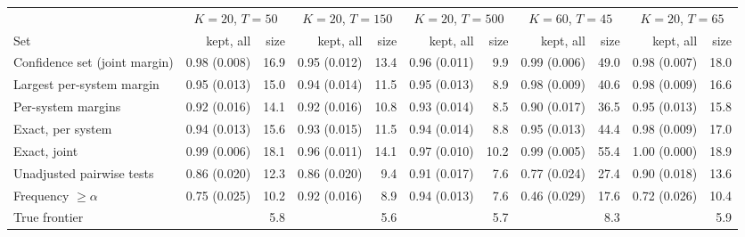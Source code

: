 \begin{tabular}{lrrrrrrrrrr}
\toprule
 & \multicolumn{2}{c}{$K=20$, $T=50$} & \multicolumn{2}{c}{$K=20$, $T=150$} & \multicolumn{2}{c}{$K=20$, $T=500$} & \multicolumn{2}{c}{$K=60$, $T=45$} & \multicolumn{2}{c}{$K=20$, $T=65$} \\
Set & kept, all & size & kept, all & size & kept, all & size & kept, all & size & kept, all & size \\
\midrule
Confidence set (joint margin) & 0.98 (0.008) & 16.9 & 0.95 (0.012) & 13.4 & 0.96 (0.011) & 9.9 & 0.99 (0.006) & 49.0 & 0.98 (0.007) & 18.0 \\
Largest per-system margin & 0.95 (0.013) & 15.0 & 0.94 (0.014) & 11.5 & 0.95 (0.013) & 8.9 & 0.98 (0.009) & 40.6 & 0.98 (0.009) & 16.6 \\
Per-system margins & 0.92 (0.016) & 14.1 & 0.92 (0.016) & 10.8 & 0.93 (0.014) & 8.5 & 0.90 (0.017) & 36.5 & 0.95 (0.013) & 15.8 \\
Exact, per system & 0.94 (0.013) & 15.6 & 0.93 (0.015) & 11.5 & 0.94 (0.014) & 8.8 & 0.95 (0.013) & 44.4 & 0.98 (0.009) & 17.0 \\
Exact, joint & 0.99 (0.006) & 18.1 & 0.96 (0.011) & 14.1 & 0.97 (0.010) & 10.2 & 0.99 (0.005) & 55.4 & 1.00 (0.000) & 18.9 \\
Unadjusted pairwise tests & 0.86 (0.020) & 12.3 & 0.86 (0.020) & 9.4 & 0.91 (0.017) & 7.6 & 0.77 (0.024) & 27.4 & 0.90 (0.018) & 13.6 \\
Frequency $\ge\alpha$ & 0.75 (0.025) & 10.2 & 0.92 (0.016) & 8.9 & 0.94 (0.013) & 7.6 & 0.46 (0.029) & 17.6 & 0.72 (0.026) & 10.4 \\
\midrule
True frontier &  & 5.8 &  & 5.6 &  & 5.7 &  & 8.3 &  & 5.9 \\
\bottomrule
\end{tabular}
